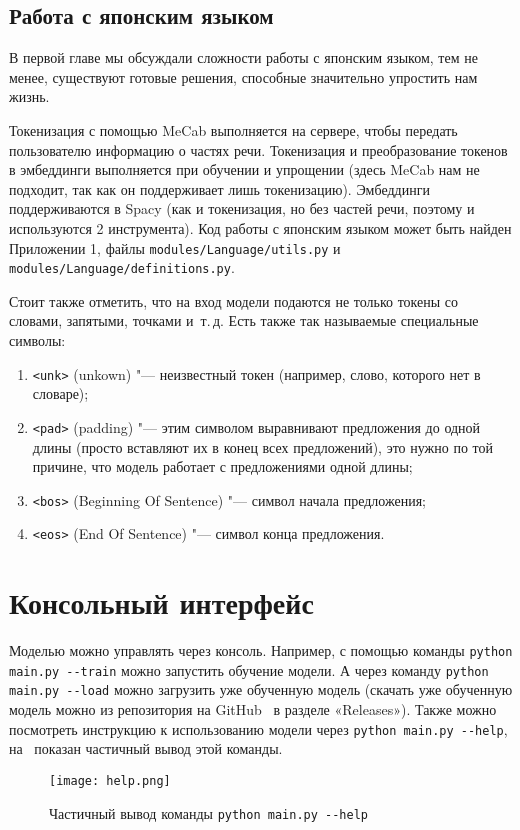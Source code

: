 \subsection{Работа с японским языком}


В первой главе мы обсуждали сложности работы с японским языком, тем не менее, существуют готовые решения, способные значительно упростить нам жизнь.

Токенизация с помощью MeCab выполняется на сервере, чтобы передать пользователю информацию о частях речи.
Токенизация и преобразование токенов в эмбеддинги выполняется при обучении и упрощении (здесь MeCab нам не подходит, так как он поддерживает лишь токенизацию).
Эмбеддинги поддерживаются в Spacy (как и токенизация, но без частей речи, поэтому и используются 2 инструмента).
Код работы с японским языком может быть найден Приложении 1, файлы \texttt{modules/Language/utils.py} и \texttt{modules/Language/definitions.py}.

Стоит также отметить, что на вход модели подаются не только токены со словами, запятыми, точками и~т.\,д.
Есть также так называемые специальные символы:
\begin{enumerate}[1.]%
  \item \texttt{<unk>} (unkown) "--- неизвестный токен (например, слово, которого нет в словаре);
  \item \texttt{<pad>} (padding) "--- этим символом выравнивают предложения до одной длины (просто вставляют их в конец всех предложений), это нужно по той причине, что модель работает с предложениями одной длины;
  \item \texttt{<bos>} (Beginning Of Sentence) "--- символ начала предложения;
  \item \texttt{<eos>} (End Of Sentence) "--- символ конца предложения.
\end{enumerate}


\section{Консольный интерфейс}


Моделью можно управлять через консоль.
Например, с помощью команды \texttt{python main.py -{}-train} можно запустить обучение модели.
А через команду \texttt{python main.py -{}-load} можно загрузить уже обученную модель (скачать уже обученную модель можно из репозитория на GitHub~\cite{ServerGithub} в разделе «Releases»).
Также можно посмотреть инструкцию к использованию модели через \texttt{python main.py -{}-help}, на~ показан частичный вывод этой команды.
\begin{figure}[H]%
  \centering
  \texttt{[image: help.png]}
  \caption{Частичный вывод команды \texttt{python main.py -{}-help}}
  \label{help}
\end{figure}

